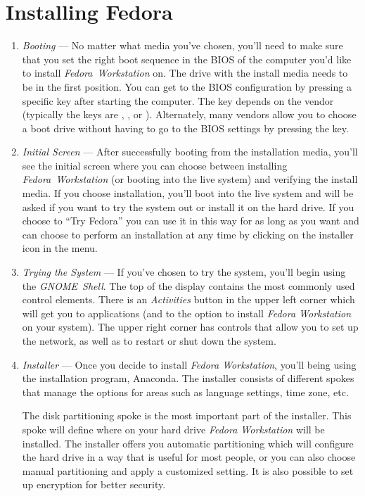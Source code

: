 \section*{Installing Fedora}
\begin{enumerate}
\item\emph{Booting} --- No matter what media you've chosen, you'll need to make sure that you set the right boot sequence in the BIOS of the computer you'd like to install \emph{Fedora~Workstation} on. The drive with the install media needs to be in the first position. You can get to the BIOS configuration by pressing a specific key after starting the computer. The key depends on the vendor (typically the keys are , , or ). Alternately, many vendors allow you to choose a boot drive without having to go to the BIOS settings by pressing the  key.

\item\emph{Initial Screen} --- After successfully booting from the installation media, you'll see the initial screen where you can choose between installing \emph{Fedora~Workstation} (or booting into the live system) and verifying the install media. If you choose installation, you'll boot into the live system and will be asked if you want to try the system out or install it on the hard drive. If you choose to \enquote{Try Fedora} you can use it in this way for as long as you want and can choose to perform an installation at any time by clicking on the installer icon in the menu.

\item\emph{Trying the System} --- If you've chosen to try the system, you'll begin using the \emph{GNOME~Shell}. The top of the display contains the most commonly used control elements. There is an \emph{Activities} button in the upper left corner which will get you to applications (and to the option to install \emph{Fedora Workstation} on your system). The upper right corner has controls that allow you to set up the network, as well as to restart or shut down the system.

\item\emph{Installer} --- Once you decide to install \emph{Fedora Workstation}, you'll being using the installation program, Anaconda. The installer consists of different spokes that manage the options for areas such as language settings, time zone, etc.

The disk partitioning spoke is the most important part of the installer. This spoke will define where on your hard drive \emph{Fedora Workstation} will be installed. The installer offers you automatic partitioning which will configure the hard drive in a way that is useful for most people, or you can also choose manual partitioning and apply a customized setting. It is also possible to set up encryption for better security.


\end{enumerate}
